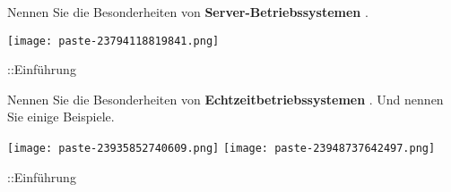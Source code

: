 \documentclass{article}
\begin{document}
\begin{tcolorbox}[colback=white!10!white,colframe=lightgray!75!black,
  savelowerto=\jobname_ex.tex]

\begin{center}
Nennen Sie die Besonderheiten von 
\textbf{Server-Betriebssystemen
}.

\end{center}

\tcblower

\justifying
\texttt{[image: paste-23794118819841.png]}

\end{tcolorbox}
\begin{tcolorbox}[colback=white!10!white,colframe=lightgray!75!black,
  savelowerto=\jobname_ex.tex]

\begin{center}
::Einführung

\end{center}

\tcblower

\justifying

\end{tcolorbox}
\begin{tcolorbox}[colback=white!10!white,colframe=lightgray!75!black,
  savelowerto=\jobname_ex.tex]

\begin{center}
Nennen Sie die Besonderheiten von 
\textbf{Echtzeitbetriebssystemen
}. Und nennen Sie einige Beispiele.

\end{center}

\tcblower

\justifying
\texttt{[image: paste-23935852740609.png]}
\texttt{[image: paste-23948737642497.png]}

\end{tcolorbox}
\begin{tcolorbox}[colback=white!10!white,colframe=lightgray!75!black,
  savelowerto=\jobname_ex.tex]

\begin{center}
::Einführung

\end{center}

\tcblower

\justifying

\end{tcolorbox}
\end{document}
